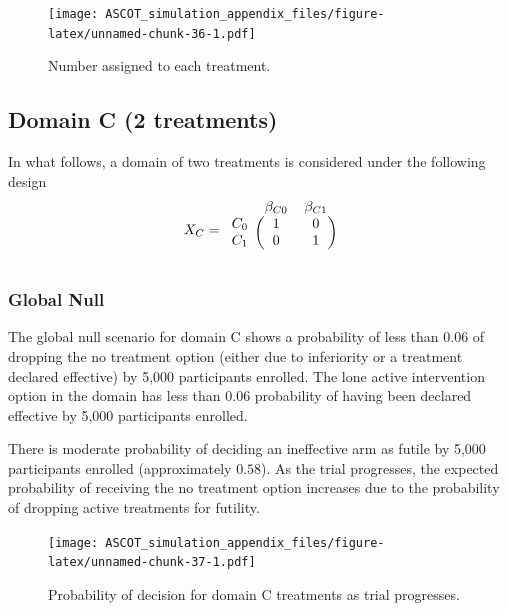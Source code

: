 \documentclass[
]{article}
\begin{document}
\begin{figure}
\centering
\texttt{[image: ASCOT\_simulation\_appendix\_files/figure-latex/unnamed-chunk-36-1.pdf]}
\caption{\label{fig:unnamed-chunk-36}Number assigned to each treatment.}
\end{figure}

\clearpage

\hypertarget{domain-c-2-treatments}{%
\subsection{Domain C (2 treatments)}\label{domain-c-2-treatments}}

In what follows, a domain of two treatments is considered under the following design
\[
 X_{C} = 
\begin{blockarray}{ccc}
          & \beta_{C0} & \beta_{C1} \\
\begin{block}{r(cc)}
      C_0 & 1 & 0 \\
      C_1 & 0 & 1 \\
\end{block}
\end{blockarray}
\]

\hypertarget{global-null}{%
\subsubsection{Global Null}\label{global-null}}

The global null scenario for domain C shows a probability of less than 0.06 of dropping the no treatment option (either due to inferiority or a treatment declared effective) by 5,000 participants enrolled.
The lone active intervention option in the domain has less than 0.06 probability of having been declared effective by 5,000 participants enrolled.

There is moderate probability of deciding an ineffective arm as futile by 5,000 participants enrolled (approximately \(0.58\)).
As the trial progresses, the expected probability of receiving the no treatment option increases due to the probability of dropping active treatments for futility.

\begin{figure}
\centering
\texttt{[image: ASCOT\_simulation\_appendix\_files/figure-latex/unnamed-chunk-37-1.pdf]}
\caption{\label{fig:unnamed-chunk-37}Probability of decision for domain C treatments as trial progresses.}
\end{figure}
\end{document}
